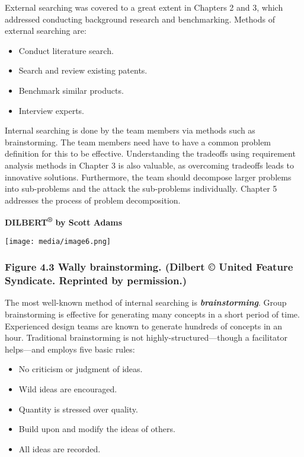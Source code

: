 External searching was covered to a great extent in Chapters 2 and 3,
which addressed conducting background research and benchmarking. Methods
of external searching are:

\begin{itemize}
\item
  Conduct literature search.
\item
  Search and review existing patents.
\item
  Benchmark similar products.
\item
  Interview experts.
\end{itemize}

Internal searching is done by the team members via methods such as
brainstorming. The team members need have to have a common problem
definition for this to be effective. Understanding the tradeoffs using
requirement analysis methods in Chapter 3 is also valuable, as
overcoming tradeoffs leads to innovative solutions. Furthermore, the
team should decompose larger problems into sub-problems and the attack
the sub-problems individually. Chapter 5 addresses the process of
problem decomposition.

\textbf{DILBERT\textsuperscript{®} by Scott Adams}

\texttt{[image: media/image6.png]}

\subsubsection*{Figure 4.3 Wally brainstorming. (Dilbert © United
Feature Syndicate. Reprinted by
permission.)}\label{figure-4.3-wally-brainstorming.-dilbert-united-feature-syndicate.-reprinted-by-permission.}

The most well-known method of internal searching is
\emph{\textbf{brainstorming}}. Group brainstorming is effective for
generating many concepts in a short period of time. Experienced design
teams are known to generate hundreds of concepts in an hour. Traditional
brainstorming is not highly-structured---though a facilitator
helps---and employs five basic rules:

\begin{itemize}
\item
  No criticism or judgment of ideas.
\item
  Wild ideas are encouraged.
\item
  Quantity is stressed over quality.
\item
  Build upon and modify the ideas of others.
\item
  All ideas are recorded.
\end{itemize}

